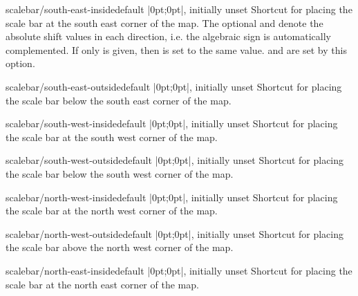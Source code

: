 \begin{docMrcKey}{scalebar/south-east-inside}{}{default |0pt;0pt|, initially unset}
  Shortcut for placing the scale bar at the south east corner of the map.
  The optional \mbox{} and  denote the
  absolute shift values in each direction, i.e. the algebraic sign is
  automatically complemented.
  If only  is given, then  is set
  to the same value.  and 
  are set by this option.
\end{docMrcKey}

\begin{docMrcKey}{scalebar/south-east-outside}{}{default |0pt;0pt|, initially unset}
  Shortcut for placing the scale bar below the south east corner of the map.
\end{docMrcKey}

\begin{docMrcKey}{scalebar/south-west-inside}{}{default |0pt;0pt|, initially unset}
  Shortcut for placing the scale bar at the south west corner of the map.
\end{docMrcKey}

\begin{docMrcKey}{scalebar/south-west-outside}{}{default |0pt;0pt|, initially unset}
  Shortcut for placing the scale bar below the south west corner of the map.
\end{docMrcKey}

\begin{docMrcKey}{scalebar/north-west-inside}{}{default |0pt;0pt|, initially unset}
  Shortcut for placing the scale bar at the north west corner of the map.
\end{docMrcKey}

\begin{docMrcKey}{scalebar/north-west-outside}{}{default |0pt;0pt|, initially unset}
  Shortcut for placing the scale bar above the north west corner of the map.
\end{docMrcKey}

\begin{docMrcKey}{scalebar/north-east-inside}{}{default |0pt;0pt|, initially unset}
  Shortcut for placing the scale bar at the north east corner of the map.
\end{docMrcKey}

